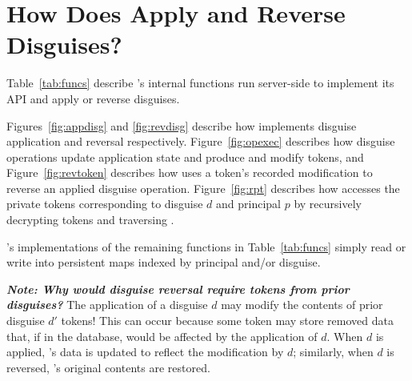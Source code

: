\section{How Does \sys Apply and Reverse Disguises?}

Table~\ref{tab:funcs} describe \sys's internal functions run server-side to implement its API 
and apply or reverse disguises. 

Figures~\ref{fig:appdisg} and \ref{fig:revdisg} describe how \sys implements disguise application and
reversal respectively. Figure~\ref{fig:opexec} describes how disguise operations update application
state and produce and modify tokens, and 
Figure~\ref{fig:revtoken} describes how \sys uses a token's recorded
modification to reverse an applied disguise operation. 
Figure~\ref{fig:rpt} describes how \sys accesses the private tokens
corresponding to disguise $d$ and principal $p$ by recursively decrypting tokens and traversing
.

\sys's implementations of the remaining functions in Table~\ref{tab:funcs} simply read or write into
persistent maps indexed by principal and/or disguise.

\vspace{6pt}\noindent\textbf{\emph{Note: Why would disguise reversal require tokens from prior disguises?}} 
The application of a disguise $d$ may modify the contents of prior disguise $d'$ tokens!
This can occur because some token \tdata{} may store removed data that, if in the database, would be
affected by the application of $d$. When $d$ is applied, \tdata{}'s data is updated to reflect the
modification by $d$; similarly, when $d$ is reversed, \tdata{}'s original contents are restored.

